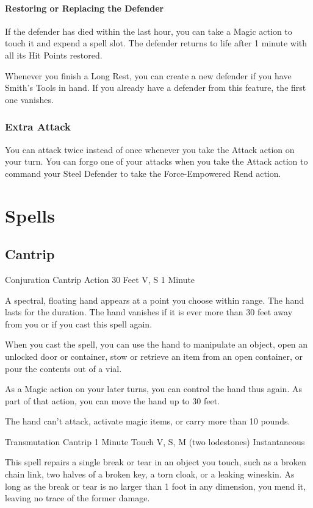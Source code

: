 \documentclass[letterpaper,openany,oneside,twocolumn]{book}
\begin{document}
\paragraph*{Restoring or Replacing the Defender} If the defender has died within the last hour, you can take a Magic action to touch it and expend a spell slot. The defender returns to life after 1 minute with all its Hit Points restored.

Whenever you finish a Long Rest, you can create a new defender if you have Smith's Tools in hand. If you already have a defender from this feature, the first one vanishes.
\subsubsection*{Extra Attack}
You can attack twice instead of once whenever you take the Attack action on your turn. You can forgo one of your attacks when you take the Attack action to command your Steel Defender to take the Force-Empowered Rend action.

\section*{Spells}
\subsection*{Cantrip}

	{Conjuration Cantrip}
	{Action}
	{30 Feet}
	{V, S}
	{1 Minute}

A spectral, floating hand appears at a point you choose within range. The hand lasts for the duration. The hand vanishes if it is ever more than 30 feet away from you or if you cast this spell again.

When you cast the spell, you can use the hand to manipulate an object, open an unlocked door or container, stow or retrieve an item from an open container, or pour the contents out of a vial.

As a Magic action on your later turns, you can control the hand thus again. As part of that action, you can move the hand up to 30 feet.

The hand can't attack, activate magic items, or carry more than 10 pounds.

	{Transmutation Cantrip}
	{1 Minute}
	{Touch}
	{V, S, M (two lodestones)}
	{Instantaneous}

This spell repairs a single break or tear in an object you touch, such as a broken chain link, two halves of a broken key, a torn cloak, or a leaking wineskin. As long as the break or tear is no larger than 1 foot in any dimension, you mend it, leaving no trace of the former damage.
\end{document}
